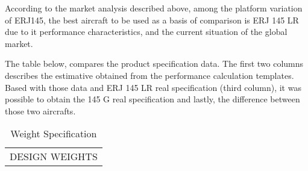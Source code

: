 According to the market analysis described above, among the platform variation of ERJ145, the best aircraft to be used as a basis of comparison is ERJ 145 LR due to it performance characteristics,  and the current situation of the global market.

The table below, compares the product specification data. The first two columns describes the estimative obtained from the performance calculation templates. Based with those data and ERJ 145 LR real specification (third column), it was possible to obtain the 145 G real specification and lastly, the difference between those two aircrafts.


\begin{table}[htbp]
  \centering
  \scriptsize
  \caption{Weight Specification}
    \begin{tabular}{rcccccc}
    \toprule
    \multicolumn{7}{c}{\multirow{2}[1]{*}{DESIGN WEIGHTS}} \\


\end{tabular}
\end{table}
